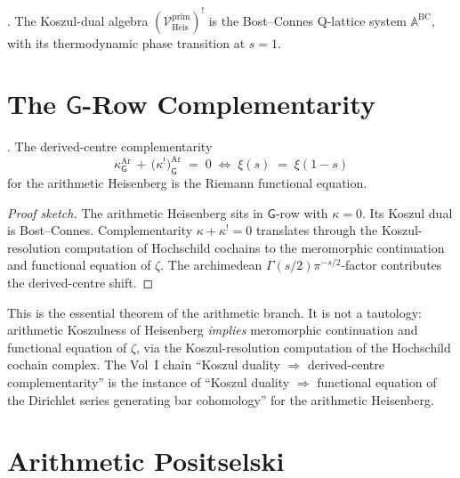 \begin{corollary}[Koszul dual = Bost--Connes]
\label{v4-arith:cor:koszul-dual-BC}
\ClaimStatusConjectured. The Koszul-dual algebra
\((\mathcal{V}^{\mathrm{prim}}_{\mathrm{Heis}})^{!}\) is the
Bost--Connes Q-lattice system \(\mathbb{A}^{\mathrm{BC}}\), with
its thermodynamic phase transition at \(s=1\).
\end{corollary}

\section{The \(\mathsf{G}\)-Row Complementarity}
\label{v4-arith:bar:G-row-complementarity}

\begin{theorem}
\label{v4-arith:thm:G-row-complementarity}
\ClaimStatusConjectured. The derived-centre complementarity
\begin{equation}
\boxed{\;\kappa^{\mathrm{Ar}}_{\mathsf{G}}\,+\,\bigl(\kappa^{!}\bigr)^{\mathrm{Ar}}_{\mathsf{G}}\;=\;0\;\Longleftrightarrow\;\xi(s)\;=\;\xi(1-s)\;}
\end{equation}
for the arithmetic Heisenberg is the Riemann functional equation.
\end{theorem}

\begin{proof}[Proof sketch]
The arithmetic Heisenberg sits in \(\mathsf{G}\)-row with
\(\kappa=0\). Its Koszul dual is Bost--Connes. Complementarity
\(\kappa+\kappa^{!}=0\) translates through the Koszul-resolution
computation of Hochschild cochains to the meromorphic continuation
and functional equation of \(\zeta\). The archimedean
\(\Gamma(s/2)\pi^{-s/2}\)-factor contributes the derived-centre
shift.
\end{proof}

\begin{remark}
This is the essential theorem of the arithmetic branch. It is
not a tautology: arithmetic Koszulness of Heisenberg \emph{implies}
meromorphic continuation and functional equation of \(\zeta\), via
the Koszul-resolution computation of the Hochschild cochain
complex. The Vol~I chain ``Koszul duality \(\Rightarrow\)
derived-centre complementarity'' is the instance of ``Koszul
duality \(\Rightarrow\) functional equation of the Dirichlet
series generating bar cohomology'' for the arithmetic Heisenberg.
\end{remark}

\section{Arithmetic Positselski}
\label{v4-arith:bar:positselski-arith}

